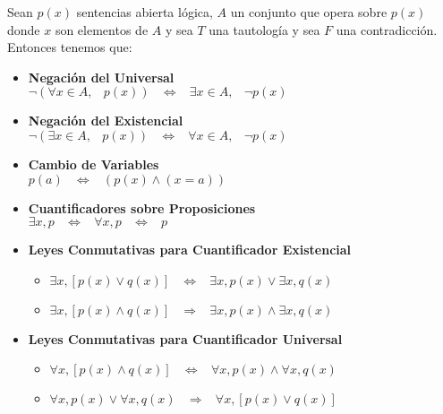 \documentclass[12pt, fleqn]{report}                             %
\DeclareMathOperator \Space     {\quad}                         %
\DeclareMathOperator \MiniSpace {\;}                            %
\theoremstyle{break}                                            %
\newcommand \lEqual  {\MiniSpace \Leftrightarrow \MiniSpace}    %
\newcommand \lInfire {\MiniSpace \Rightarrow \MiniSpace}        %
\begin{document}
                Sean $p(x)$ sentencias abierta lógica, $A$ un conjunto que opera sobre $p(x)$ donde $x$ son
                elementos de $A$ y sea $T$ una tautología y sea $F$ una contradicción.
                Entonces tenemos que:

                \begin{itemize}
                    \item
                    \textbf{Negación del Universal} \\
                    $\lnot (\forall x \in A,\MiniSpace p(x)) \lEqual \exists x \in A,\MiniSpace \lnot p(x)$

                    \item
                    \textbf{Negación del Existencial} \\
                    $\lnot (\exists x \in A,\MiniSpace p(x)) \lEqual \forall x \in A,\MiniSpace \lnot p(x)$

                    \item \textbf{Cambio de Variables} \\
                            $p(a) \lEqual (p(x) \land (x=a))$
                            
                    \item \textbf{Cuantificadores sobre Proposiciones} \\
                            $\exists x, p \lEqual \forall x, p \lEqual p$

                    \item \textbf{Leyes Conmutativas para Cuantificador Existencial}

                        \begin{itemize}

                            \item
                            $\exists x, [p(x) \lor q(x)] \lEqual \exists x, p(x) \lor \exists x, q(x)$

                            \item
                            $\exists x, [p(x) \land q(x)] \lInfire \exists x, p(x) \land \exists x, q(x)$

                        \end{itemize}

                    \item \textbf{Leyes Conmutativas para Cuantificador Universal}

                        \begin{itemize}
                            
                            \item
                            $\forall x, [p(x) \land q(x)] \lEqual \forall x, p(x) \land \forall x, q(x)$

                            \item
                            $\forall x, p(x) \lor \forall x, q(x) \lInfire \forall x, [p(x) \lor q(x)]$

                        \end{itemize}
                        
                \end{itemize}
\end{document}
